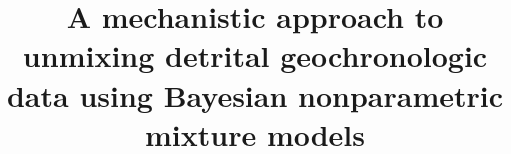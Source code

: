%
%
%
%
%
%
\RequirePackage{fix-cm}
%
\documentclass[smallextended]{svjour3}       %
%
\smartqed  %
%
\usepackage{graphicx}
%
%
\usepackage{url}
\usepackage{hyperref}
\usepackage{amsmath}
\usepackage{float}
\usepackage{subcaption}
\captionsetup{compatibility=false}
\usepackage{setspace}
\usepackage{lineno}
\usepackage{textcomp}
\usepackage{gensymb}
%
\usepackage{xcolor} %
%
\usepackage{natbib} %
%
\newcommand\numberthis{\addtocounter{equation}{1}\tag{\theequation}}
%
%
%


\title{A mechanistic approach to unmixing detrital geochronologic data using Bayesian nonparametric mixture models%
}
\subtitle{}

